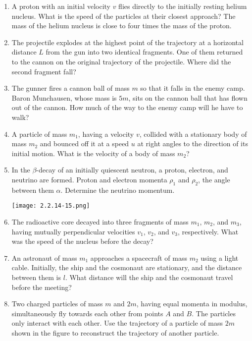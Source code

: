 \documentclass{article}
\begin{document}
\begin{enumerate}[label=2.2.\arabic*]
\item A proton with an initial velocity $v$ flies directly to the initially resting helium nucleus. What is the speed of the particles at their closest approach? The mass of the helium nucleus is close to four times the mass of the proton.

\item The projectile explodes at the highest point of the trajectory at a horizontal distance $L$ from the gun into two identical fragments. One of them returned to the cannon on the original trajectory of the projectile. Where did the second fragment fall?

\item The gunner fires a cannon ball of mass $m$ so that it falls in the enemy camp. Baron Munchausen, whose mass is $5 m$, sits on the cannon ball that has flown out of the cannon. How much of the way to the enemy camp will he have to walk?

\item A particle of mass $m_1$, having a velocity $v$, collided with a stationary body of mass $m_2$ and bounced off it at a speed $u$ at right angles to the direction of its initial motion. What is the velocity of a body of mass $m_2$?

\item In the $\beta$-decay of an initially quiescent neutron, a proton, electron, and neutrino are formed. Proton and electron momenta $\rho_1$ and $\rho_2$, the angle between them $\alpha$. Determine the neutrino momentum.

\begin{center}
    \texttt{[image: 2.2.14-15.png]}
\end{center}

\item The radioactive core decayed into three fragments of mass $m_1$, $m_2$, and $m_3$, having mutually perpendicular velocities $v_1$, $v_2$, and $v_3$, respectively. What was the speed of the nucleus before the decay?

\item An astronaut of mass $m_1$ approaches a spacecraft of mass $m_2$ using a light cable. Initially, the ship and the cosmonaut are stationary, and the distance between them is $l$. What distance will the ship and the cosmonaut travel before the meeting?

\item Two charged particles of mass $m$ and $2m$, having equal momenta in modulus, simultaneously fly towards each other from points $A$ and $B$. The particles only interact with each other. Use the trajectory of a particle of mass $2m$ shown in the figure to reconstruct the trajectory of another particle.


\end{enumerate}
\end{document}
